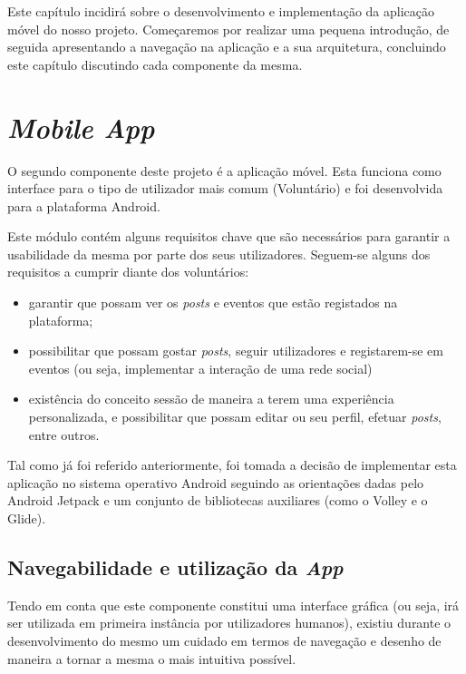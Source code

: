Este capítulo incidirá sobre o desenvolvimento e implementação da aplicação móvel do nosso projeto. Começaremos por realizar uma pequena introdução, de seguida apresentando a navegação na aplicação e a sua arquitetura, concluindo este capítulo discutindo cada componente da mesma.

\bigskip

\section{\textit{Mobile App}}

O segundo componente deste projeto é a aplicação móvel. Esta funciona como interface para o tipo de utilizador mais comum (Voluntário) e foi desenvolvida para a plataforma Android.

\bigskip

Este módulo contém alguns requisitos chave que são necessários para garantir a usabilidade da mesma por parte dos seus utilizadores. Seguem-se alguns dos requisitos a cumprir diante dos voluntários:

\begin{itemize}
	\item garantir que possam ver os \textit{posts} e eventos que estão registados na plataforma;
	\item possibilitar que possam gostar \textit{posts}, seguir utilizadores e registarem-se em eventos (ou seja, implementar a interação de uma rede social)
	\item existência do conceito sessão de maneira a terem uma experiência personalizada, e possibilitar que possam editar ou seu perfil, efetuar \textit{posts}, entre outros.
\end{itemize}

Tal como já foi referido anteriormente, foi tomada a decisão de implementar esta aplicação no sistema operativo Android seguindo as orientações dadas pelo Android Jetpack e um conjunto de bibliotecas auxiliares (como o Volley e o Glide).

\bigskip

\subsection{Navegabilidade e utilização da \textit{App}}

Tendo em conta que este componente constitui uma interface gráfica (ou seja, irá ser utilizada em primeira instância por utilizadores humanos), existiu durante o desenvolvimento do mesmo um cuidado em termos de navegação e desenho de maneira a tornar a mesma o mais intuitiva possível. 

